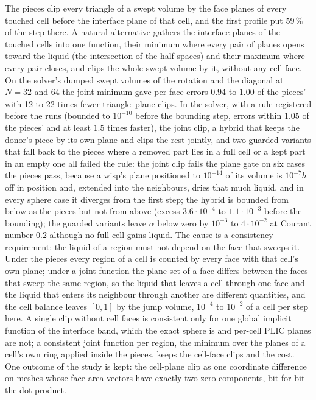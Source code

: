 \documentclass[preprint,12pt]{elsarticle}
\begin{document}
The pieces clip every triangle of a swept volume by the face planes of every touched cell before the interface plane of that cell, and the first profile put $59\,\%$ of the step there. A natural alternative gathers the interface planes of the touched cells into one function, their minimum where every pair of planes opens toward the liquid (the intersection of the half-spaces) and their maximum where every pair closes, and clips the whole swept volume by it, without any cell face. On the solver's dumped swept volumes of the rotation and the diagonal at $N = 32$ and $64$ the joint minimum gave per-face errors $0.94$ to $1.00$ of the pieces' with 12 to 22 times fewer triangle--plane clips. In the solver, with a rule registered before the runs (bounded to $10^{-10}$ before the bounding step, errors within $1.05$ of the pieces' and at least $1.5$ times faster), the joint clip, a hybrid that keeps the donor's piece by its own plane and clips the rest jointly, and two guarded variants that fall back to the pieces where a removed part lies in a full cell or a kept part in an empty one all failed the rule: the joint clip fails the plane gate on six cases the pieces pass, because a wisp's plane positioned to $10^{-14}$ of its volume is $10^{-7}h$ off in position and, extended into the neighbours, dries that much liquid, and in every sphere case it diverges from the first step; the hybrid is bounded from below as the pieces but not from above (excess $3.6\cdot10^{-4}$ to $1.1\cdot10^{-3}$ before the bounding); the guarded variants leave $\alpha$ below zero by $10^{-3}$ to $4\cdot10^{-2}$ at Courant number $0.2$ although no full cell gains liquid. The cause is a consistency requirement: the liquid of a region must not depend on the face that sweeps it. Under the pieces every region of a cell is counted by every face with that cell's own plane; under a joint function the plane set of a face differs between the faces that sweep the same region, so the liquid that leaves a cell through one face and the liquid that enters its neighbour through another are different quantities, and the cell balance leaves $[0, 1]$ by the jump volume, $10^{-4}$ to $10^{-2}$ of a cell per step here. A single clip without cell faces is consistent only for one global implicit function of the interface band, which the exact sphere is and per-cell PLIC planes are not; a consistent joint function per region, the minimum over the planes of a cell's own ring applied inside the pieces, keeps the cell-face clips and the cost. One outcome of the study is kept: the cell-plane clip as one coordinate difference on meshes whose face area vectors have exactly two zero components, bit for bit the dot product.
\end{document}
